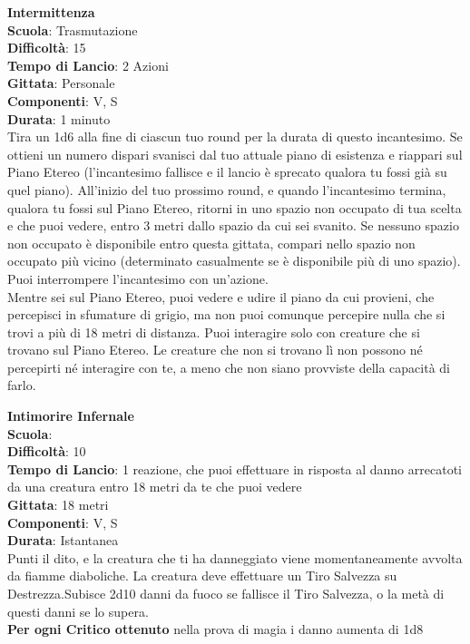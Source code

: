 \begin{multicols}{2}
\medskip\textbf{Intermittenza}\\
\textbf{Scuola}: Trasmutazione\\
\textbf{Difficoltà}:  15\\
\textbf{Tempo di Lancio}: 2 Azioni\\
\textbf{Gittata}: Personale\\
\textbf{Componenti}: V, S\\
\textbf{Durata}: 1 minuto\\
Tira un 1d6 alla fine di ciascun tuo round per la durata di questo incantesimo. Se ottieni un numero dispari svanisci dal tuo attuale piano di esistenza e riappari sul Piano Etereo (l'incantesimo fallisce e il lancio è sprecato qualora tu fossi già su quel piano). All'inizio del tuo prossimo round, e quando l'incantesimo termina, qualora tu fossi sul Piano Etereo, ritorni in uno spazio non occupato di tua scelta e che puoi vedere, entro 3 metri dallo spazio da cui sei svanito. Se nessuno spazio non occupato è disponibile entro questa gittata, compari nello spazio non occupato più vicino (determinato casualmente se è disponibile più di uno spazio). Puoi interrompere l'incantesimo con un'azione.\\
Mentre sei sul Piano Etereo, puoi vedere e udire il piano da cui provieni, che percepisci in sfumature di grigio, ma non puoi comunque percepire nulla che si trovi a più di 18 metri di distanza. Puoi interagire solo con creature che si trovano sul Piano Etereo. Le creature che non si trovano lì non possono né percepirti né interagire con te, a meno che non siano provviste della capacità di farlo.

\medskip\textbf{Intimorire Infernale}\\
\textbf{Scuola}: \\\textbf{Difficoltà}:  10\\
\textbf{Tempo di Lancio}: 1 reazione, che puoi effettuare in risposta al danno arrecatoti da una creatura entro 18 metri da te che puoi vedere\\
\textbf{Gittata}: 18 metri\\
\textbf{Componenti}: V, S\\
\textbf{Durata}: Istantanea\\
Punti il dito, e la creatura che ti ha danneggiato viene momentaneamente avvolta da fiamme diaboliche. La creatura deve effettuare un Tiro Salvezza su Destrezza.Subisce 2d10 danni da fuoco se  fallisce il Tiro Salvezza, o la metà di questi danni se lo supera.\\
\textbf{Per ogni Critico ottenuto} nella prova di magia i danno aumenta di 1d8


\end{multicols}
